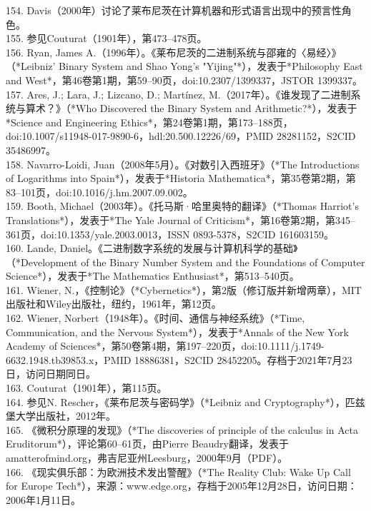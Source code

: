 154. Davis（2000年）讨论了莱布尼茨在计算机器和形式语言出现中的预言性角色。\\
155. 参见Couturat（1901年），第473–478页。\\
156. Ryan, James A.（1996年）。《莱布尼茨的二进制系统与邵雍的〈易经〉》（*Leibniz' Binary System and Shao Yong's "Yijing"*），发表于*Philosophy East and West*，第46卷第1期，第59–90页，doi:10.2307/1399337，JSTOR 1399337。\\
157. Ares, J.; Lara, J.; Lizcano, D.; Martínez, M.（2017年）。《谁发现了二进制系统与算术？》（*Who Discovered the Binary System and Arithmetic?*），发表于*Science and Engineering Ethics*，第24卷第1期，第173–188页，doi:10.1007/s11948-017-9890-6，hdl:20.500.12226/69，PMID 28281152，S2CID 35486997。\\
158. Navarro-Loidi, Juan（2008年5月）。《对数引入西班牙》（*The Introductions of Logarithms into Spain*），发表于*Historia Mathematica*，第35卷第2期，第83–101页，doi:10.1016/j.hm.2007.09.002。\\
159. Booth, Michael（2003年）。《托马斯·哈里奥特的翻译》（*Thomas Harriot's Translations*），发表于*The Yale Journal of Criticism*，第16卷第2期，第345–361页，doi:10.1353/yale.2003.0013，ISSN 0893-5378，S2CID 161603159。\\
160. Lande, Daniel。《二进制数字系统的发展与计算机科学的基础》（*Development of the Binary Number System and the Foundations of Computer Science*），发表于*The Mathematics Enthusiast*，第513–540页。\\
161. Wiener, N.，《控制论》（*Cybernetics*），第2版（修订版并新增两章），MIT出版社和Wiley出版社，纽约，1961年，第12页。\\
162. Wiener, Norbert（1948年）。《时间、通信与神经系统》（*Time, Communication, and the Nervous System*），发表于*Annals of the New York Academy of Sciences*，第50卷第4期，第197–220页，doi:10.1111/j.1749-6632.1948.tb39853.x，PMID 18886381，S2CID 28452205。存档于2021年7月23日，访问日期同日。\\
163. Couturat（1901年），第115页。\\
164. 参见N. Rescher，《莱布尼茨与密码学》（*Leibniz and Cryptography*），匹兹堡大学出版社，2012年。\\
165. 《微积分原理的发现》（*The discoveries of principle of the calculus in Acta Eruditorum*），评论第60–61页，由Pierre Beaudry翻译，发表于amatterofmind.org，弗吉尼亚州Leesburg，2000年9月（PDF）。\\
166. 《现实俱乐部：为欧洲技术发出警醒》（*The Reality Club: Wake Up Call for Europe Tech*），来源：www.edge.org，存档于2005年12月28日，访问日期：2006年1月11日。\\ 
